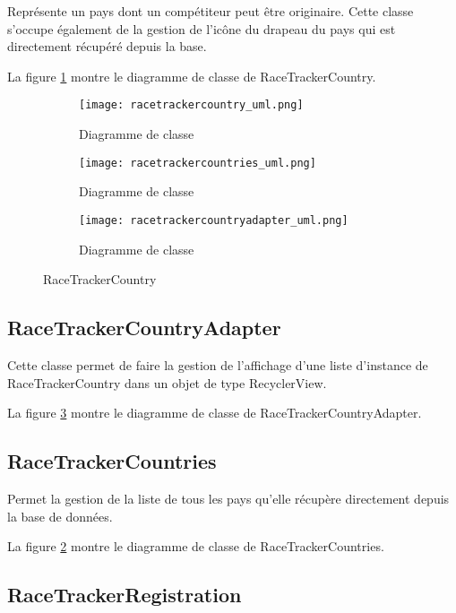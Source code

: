 Représente un pays dont un compétiteur peut être originaire. Cette classe s'occupe également de la gestion de l'icône du drapeau du pays qui est directement récupéré depuis la base.

La figure \ref{fig:racetrackercountry_uml} montre le diagramme de classe de RaceTrackerCountry.

\begin{figure}[htb!]
    \centering
    \begin{subfigure}[htb]{1\textwidth}
		\texttt{[image: racetrackercountry\_uml.png]} 
		\caption{Diagramme de classe}
		\label{fig:racetrackercountry_uml}
    \end{subfigure}
    \begin{subfigure}[htb]{1\textwidth}
		\texttt{[image: racetrackercountries\_uml.png]} 
		\caption{Diagramme de classe}
		\label{fig:racetrackercountries_uml}
    \end{subfigure}
    \begin{subfigure}[htb]{1\textwidth}
		\texttt{[image: racetrackercountryadapter\_uml.png]} 
		\caption{Diagramme de classe}
		\label{fig:racetrackercountryadapter_uml}
    \end{subfigure}
    \caption{RaceTrackerCountry}\label{fig:racetrackercountry_fig}
\end{figure}

\subsection{RaceTrackerCountryAdapter}

Cette classe permet de faire la gestion de l'affichage d'une liste d'instance de RaceTrackerCountry dans un objet de type RecyclerView.

La figure \ref{fig:racetrackercountryadapter_uml} montre le diagramme de classe de RaceTrackerCountryAdapter.

\subsection{RaceTrackerCountries}

Permet la gestion de la liste de tous les pays qu'elle récupère directement depuis la base de données.

La figure \ref{fig:racetrackercountries_uml} montre le diagramme de classe de RaceTrackerCountries.

\subsection{RaceTrackerRegistration}

